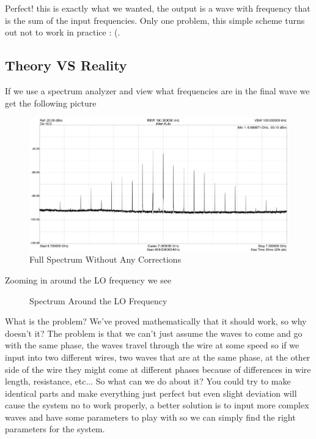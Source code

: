 Perfect! this is exactly what we wanted, the output is a wave with frequency that is the sum of the input frequencies. Only one problem, this simple scheme turns out not to work in practice : (.

\subsection{Theory VS Reality} \label{sec:solution_real_world} %
If we use a spectrum analyzer and view what frequencies are in the final wave we get the following picture

\begin{figure}[H]
    \centering
    \includegraphics[width=1\columnwidth]{gfx/full-spectrum-no-correction.jpg} %
    \caption{Full Spectrum Without Any Corrections}
    \label{fig:Full-spectrum-no-corrections}
\end{figure}
Zooming in around the LO frequency we see
\begin{figure}[H]
    \centering
     
    \caption{Spectrum Around the LO Frequency}
    \label{fig:closeup-spectrum-no-corrections}
\end{figure}

What is the problem? We've proved mathematically that it should work, so why doesn't it? The problem is that we can't just assume the waves to come and go with the same phase, the waves travel through the wire at some speed so if we input into two different wires, two waves that are at the same phase, at the other side of the wire they might come at different phases because of differences in wire length, resistance, etc... So what can we do about it? You could try to make identical parts and make everything just perfect but even slight deviation will cause the system no to work properly, a better solution is to input more complex waves and have some parameters to play with so we can simply find the right parameters for the system.%

